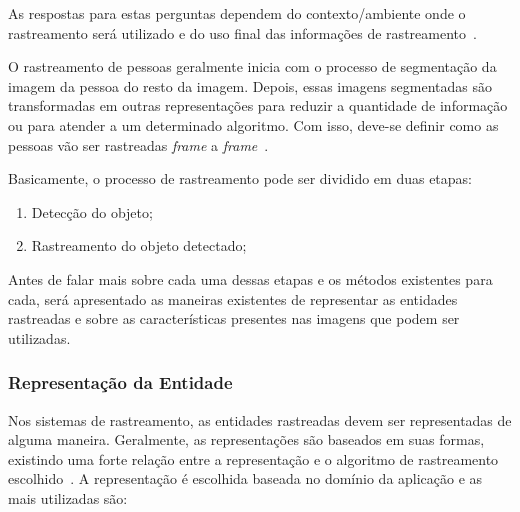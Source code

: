 	As respostas para estas perguntas dependem do contexto/ambiente onde o rastreamento será utilizado e do uso final das informações de rastreamento~\cite{yilmaz}.

	O rastreamento de pessoas geralmente inicia com o processo de segmentação da imagem da pessoa do resto da imagem. Depois, essas imagens segmentadas são transformadas em outras representações para reduzir a quantidade de informação ou para atender a um determinado algoritmo. Com isso, deve-se definir como as pessoas vão ser rastreadas \textit{frame} a \textit{frame}~\cite{moeslund}.

	Basicamente, o processo de rastreamento pode ser dividido em duas etapas:

		\begin{enumerate}
			\item Detecção do objeto;
			\item Rastreamento do objeto detectado;
		\end{enumerate}

	Antes de falar mais sobre cada uma dessas etapas e os métodos existentes para cada, será apresentado as maneiras existentes de representar as entidades rastreadas e sobre as características presentes nas imagens que podem ser utilizadas.


\subsubsection{Representação da Entidade}
\label{sec:representacao-objeto}

	Nos sistemas de rastreamento, as entidades rastreadas devem ser representadas de alguma maneira. Geralmente, as representações são baseados em suas formas, existindo uma forte relação entre a representação e o algoritmo de rastreamento escolhido~\cite{yilmaz}. A representação é escolhida baseada no domínio da aplicação e as mais utilizadas são:

